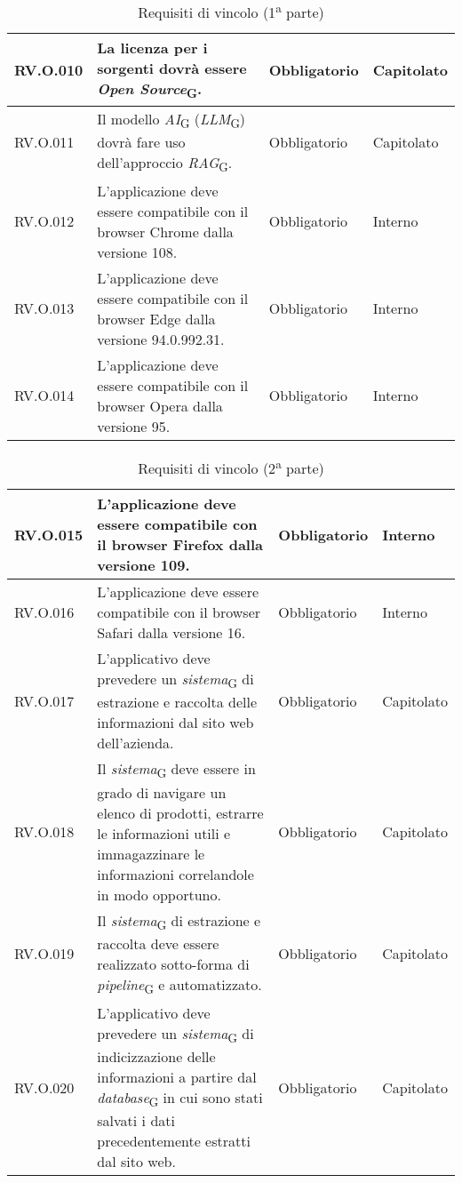 \begin{table}[H]
\begin{tabular}{|C{2.7cm}|L{6.5cm}|C{2.7cm}|C{2.7cm}|}
         \hline
        RV.O.010 & La licenza per i sorgenti dovrà essere \textit{Open Source}\textsubscript{G}.
         & Obbligatorio & Capitolato \\
        \hline
        RV.O.011 & Il modello \textit{AI}\textsubscript{G} (\textit{LLM}\textsubscript{G}) dovrà fare uso dell’approccio \textit{RAG}\textsubscript{G}.
         & Obbligatorio & Capitolato \\
        \hline
        RV.O.012 & L’applicazione deve essere compatibile con il browser Chrome dalla
        versione 108.
         & Obbligatorio & Interno \\
         \hline
        RV.O.013 & L’applicazione deve essere compatibile con il browser Edge dalla versione 94.0.992.31.
         & Obbligatorio & Interno \\
        \hline
        RV.O.014 & L’applicazione deve essere compatibile con il browser Opera dalla
        versione 95.
         & Obbligatorio & Interno \\
         \hline
    \end{tabular}
    \caption{Requisiti di vincolo (1\textsuperscript{a}  parte)}
\end{table}
\begin{table}[H]
\centering
    \begin{tabular}{|C{2.7cm}|L{6.5cm}|C{2.7cm}|C{2.7cm}|}
        \hline
        RV.O.015 & L’applicazione deve essere compatibile con il browser Firefox dalla
versione 109.
         & Obbligatorio & Interno \\
        \hline
        RV.O.016 & L’applicazione deve essere compatibile con il browser Safari dalla
versione 16.
         & Obbligatorio & Interno \\
          \hline
        RV.O.017 &  L’applicativo deve prevedere un \textit{sistema}\textsubscript{G} di estrazione e raccolta delle informazioni dal sito web dell'azienda.
         & Obbligatorio & Capitolato \\
         \hline
         RV.O.018 & Il \textit{sistema}\textsubscript{G} deve essere in grado di navigare un elenco di prodotti, estrarre le informazioni utili e immagazzinare le informazioni correlandole in modo opportuno.
         & Obbligatorio & Capitolato \\
         \hline
         RV.O.019 & Il \textit{sistema}\textsubscript{G} di estrazione e raccolta deve essere realizzato sotto-forma di \textit{pipeline}\textsubscript{G} e automatizzato.
         & Obbligatorio & Capitolato \\
        \hline
         RV.O.020 & L’applicativo deve prevedere un \textit{sistema}\textsubscript{G} di indicizzazione delle informazioni a partire dal
        \textit{database}\textsubscript{G} in cui sono stati salvati i dati precedentemente estratti dal sito web.
         & Obbligatorio & Capitolato \\
        \hline
    \end{tabular}
    \caption{Requisiti di vincolo (2\textsuperscript{a}  parte)}
\end{table}